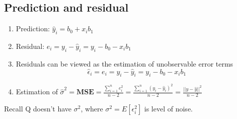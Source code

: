 \documentclass[11pt]{article}
\theoremstyle{definition}
\begin{document}
\subsection*{Prediction and residual}
\begin{enumerate}
\item Prediction: $\hat{y}_i = b_0 + x_ib_1$
\item Residual: $e_i = y_i - \hat{y}_i = y_i - b_0 - x_ib_1$
\item Residuals can be viewed as the estimation of unobservable error terms\\
$$\hat{\epsilon}_i = e_i = y_i - \hat{y}_i = y_i - b_0 - x_ib_1$$
\item Estimation of $\hat{\sigma}^2 = \textbf{MSE} = \frac{\sum_{i = 1}^n e_i^2}{n - 2} = \frac{\sum_{i = 1}^n (y_i - \hat{y}_i)^2}{n - 2} = \frac{||y - \hat{y}||^2}{n - 2}$
\end{enumerate}
Recall Q doesn't have $\sigma^2$, where $\sigma^2 = E[\epsilon_i^2]$ is level of noise.
\end{document}
